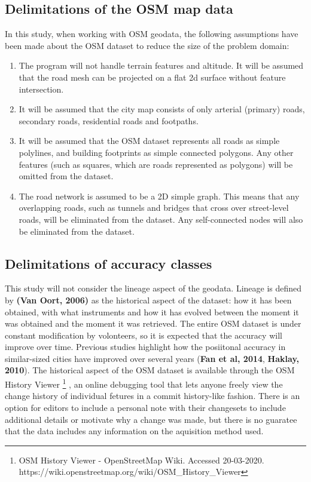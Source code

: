 \documentclass{kththesis}
\begin{document}
\subsection{Delimitations of the OSM map data}

In this study, when working with OSM geodata, the following assumptions have been made about the OSM dataset to reduce the size of the problem domain:

\begin{enumerate}
    \item The program will not handle terrain features and altitude. It will be assumed that the road mesh can be projected on a flat 2d surface without feature intersection.
    \item It will be assumed that the city map consists of only arterial (primary) roads, secondary roads, residential roads and footpaths.
    \item It will be assumed that the OSM dataset represents all roads as simple polylines, and building footprints as simple connected polygons. Any other features (such as squares, which are roads represented as polygons) will be omitted from the dataset.
    \item The road network is assumed to be a 2D simple graph. This means that any overlapping roads, such as tunnels and bridges that cross over street-level roads, will be eliminated from the dataset. Any self-connected nodes will also be eliminated from the dataset.
\end{enumerate}

\subsection{Delimitations of accuracy classes}

This study will not consider the lineage aspect of the geodata.
Lineage is defined by \textbf{(Van Oort, 2006)} as the historical aspect of the dataset: how it has been obtained, with what instruments and how it has evolved between the moment it was obtained and the moment it was retrieved.
The entire OSM dataset is under constant modification by volonteers, so it is expected that the accuracy will improve over time. Previous studies highlight how the posiitonal accuracy in similar-sized cities have improved over several years (\textbf{Fan et al, 2014}, \textbf{Haklay, 2010}).
The historical aspect of the OSM dataset is available through the OSM History Viewer
\footnote{OSM History Viewer - OpenStreetMap Wiki. Accessed 20-03-2020. https://wiki.openstreetmap.org/wiki/OSM\_History\_Viewer}
, an online debugging tool that lets anyone freely view the change history of individual fetures in a commit history-like fashion.
There is an option for editors to include a personal note with their changesets to include additional details or motivate why a change was made, but there is no guaratee that the data includes any information on the aquisition method used.
\end{document}
